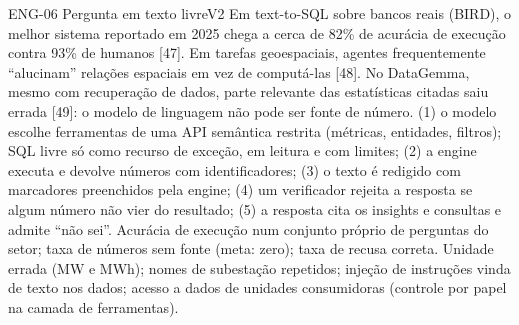 \begin{ficha}{ENG-06 \textperiodcentered{} Pergunta em texto livre}{V2}
 Em text-to-SQL sobre bancos reais (BIRD), o melhor
sistema reportado em 2025 chega a cerca de 82\% de acurácia de execução contra 93\% de humanos
[47]. Em tarefas geoespaciais, agentes frequentemente ``alucinam'' relações
espaciais em vez de computá-las [48]. No DataGemma, mesmo com recuperação de
dados, parte relevante das estatísticas citadas saiu errada [49]: o modelo de
linguagem não pode ser fonte de número.
 (1) o modelo escolhe ferramentas de uma API
semântica restrita (métricas, entidades, filtros); SQL livre só como recurso
de exceção, em leitura e com limites; (2) a engine executa e devolve números
com identificadores; (3) o texto é redigido com marcadores preenchidos pela
engine; (4) um verificador rejeita a resposta se algum número não vier do
resultado; (5) a resposta cita os insights e consultas e admite ``não sei''.
 Acurácia de execução num conjunto próprio de perguntas do
setor; taxa de números sem fonte (meta: zero); taxa de recusa correta.
 Unidade errada (MW e MWh); nomes de subestação repetidos;
injeção de instruções vinda de texto nos dados; acesso a dados de unidades
consumidoras (controle por papel na camada de ferramentas).
\end{ficha}

